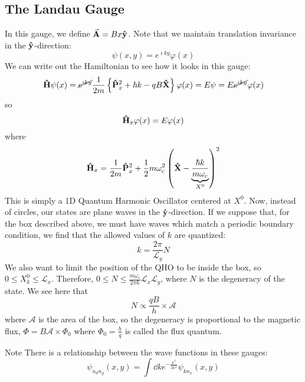 \documentclass[a4paper,twoside,master.tex]{subfiles}
\begin{document}
\subsection{The Landau Gauge}
\label{sub:the_landau_gauge}

In this gauge, we define $ \va{A} = Bx \vu{y} $. Note that we maintain translation invariance in the $ \vu{y} $-direction:
\begin{equation}
    \psi(x,y) = e^{\imath k y} \varphi(x)
\end{equation}
We can write out the Hamiltonian to see how it looks in this gauge:
\begin{equation}
    \vu{H} \psi(x) = \cancel{e^{\imath ky}} \frac{1}{2m} \left\{ \vu{P}_x^2 + \hbar k - qB \vu{X} \right\} \varphi(x) = E \psi = E \cancel{e^{\imath k y}} \varphi(x)
\end{equation}
so
\begin{equation}
    \vu{H}_x \varphi(x) = E \varphi(x)
\end{equation}
where
\begin{equation}
    \vu{H}_x = \frac{1}{2m} \vu{P}_x^2 + \frac{1}{2} m \omega^2_c \left( \vu{X} - \underbrace{\frac{\hbar k}{m \omega_c}}_{X^0} \right)^2
\end{equation}
This is simply a 1D Quantum Harmonic Oscillator centered at $ X^0 $. Now, instead of circles, our states are plane waves in the $ \vu{y} $-direction. If we suppose that, for the box described above, we must have waves which match a periodic boundary condition, we find that the allowed values of $ k $ are quantized:
\begin{equation}
    k = \frac{2 \pi}{\mathcal{L}_y} N
\end{equation}
We also want to limit the position of the QHO to be inside the box, so $ 0 \leq X^0_k \leq \mathcal{L}_x $. Therefore, $ 0 \leq N \leq \frac{m \omega_c}{2 \pi \hbar} \mathcal{L}_x \mathcal{L}_y $, where $ N $ is the degeneracy of the state. We see here that
\begin{equation}
    N \propto \frac{qB}{h} \times \mathcal{A}
\end{equation}
where $ \mathcal{A} $ is the area of the box, so the degeneracy is proportional to the magnetic flux, $ \Phi = B\mathcal{A} \times \Phi_0 $ where $ \Phi_0 = \frac{h}{q} $ is called the flux quantum.

\begin{note}{Note}
    There is a relationship between the wave functions in these gauges:
    \begin{equation}
        \psi_{n_d n_g}(x,y) = \int \dd{k} e^{- \frac{k^2}{2 \kappa^2}} \psi_{k n_x}(x,y)
    \end{equation}
\end{note}
\end{document}

